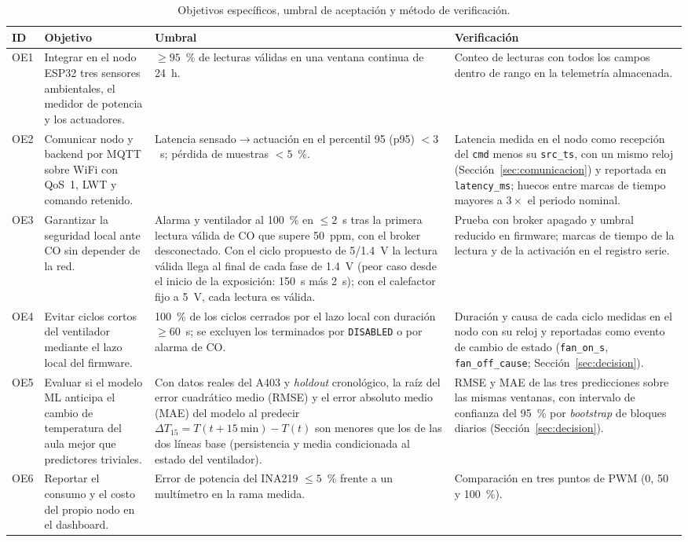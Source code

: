 \documentclass[manuscript,screen,nonacm,natbib=false]{acmart}
\begin{document}
\begin{table}[htbp]
\caption{Objetivos específicos, umbral de aceptación y método de verificación.}
\label{tab:objetivos}
\footnotesize
\begin{tabularx}{\linewidth}{@{}l Y Y Y@{}}
\toprule
ID & Objetivo & Umbral & Verificación \\
\midrule
OE1 & Integrar en el nodo ESP32 tres sensores ambientales, el medidor de potencia y los actuadores. & $\geq 95$~\% de lecturas válidas en una ventana continua de 24~h. & Conteo de lecturas con todos los campos dentro de rango en la telemetría almacenada. \\
OE2 & Comunicar nodo y backend por MQTT sobre WiFi con QoS~1, LWT y comando retenido. & Latencia sensado$\to$actuación en el percentil 95 (p95) $<3$~s; pérdida de muestras $<5$~\%. & Latencia medida en el nodo como recepción del \texttt{cmd} menos su \texttt{src\_ts}, con un mismo reloj (Sección~\ref{sec:comunicacion}) y reportada en \texttt{latency\_ms}; huecos entre marcas de tiempo mayores a $3\times$ el periodo nominal. \\
OE3 & Garantizar la seguridad local ante CO sin depender de la red. & Alarma y ventilador al 100~\% en $\leq 2$~s tras la primera lectura válida de CO que supere 50~ppm, con el broker desconectado. Con el ciclo propuesto de 5/1.4~V la lectura válida llega al final de cada fase de 1.4~V (peor caso desde el inicio de la exposición: 150~s más 2~s); con el calefactor fijo a 5~V, cada lectura es válida. & Prueba con broker apagado y umbral reducido en firmware; marcas de tiempo de la lectura y de la activación en el registro serie. \\
OE4 & Evitar ciclos cortos del ventilador mediante el lazo local del firmware. & 100~\% de los ciclos cerrados por el lazo local con duración $\geq 60$~s; se excluyen los terminados por \texttt{DISABLED} o por alarma de CO. & Duración y causa de cada ciclo medidas en el nodo con su reloj y reportadas como evento de cambio de estado (\texttt{fan\_on\_s}, \texttt{fan\_off\_cause}; Sección~\ref{sec:decision}). \\
OE5 & Evaluar si el modelo ML anticipa el cambio de temperatura del aula mejor que predictores triviales. & Con datos reales del A403 y \textit{holdout} cronológico, la raíz del error cuadrático medio (RMSE) y el error absoluto medio (MAE) del modelo al predecir $\Delta T_{15} = T(t+15~\mathrm{min}) - T(t)$ son menores que los de las dos líneas base (persistencia y media condicionada al estado del ventilador). & RMSE y MAE de las tres predicciones sobre las mismas ventanas, con intervalo de confianza del 95~\% por \textit{bootstrap} de bloques diarios (Sección~\ref{sec:decision}). \\
OE6 & Reportar el consumo y el costo del propio nodo en el dashboard. & Error de potencia del INA219 $\leq 5$~\% frente a un multímetro en la rama medida. & Comparación en tres puntos de PWM (0, 50 y 100~\%). \\
\bottomrule
\end{tabularx}
\end{table}
\end{document}
